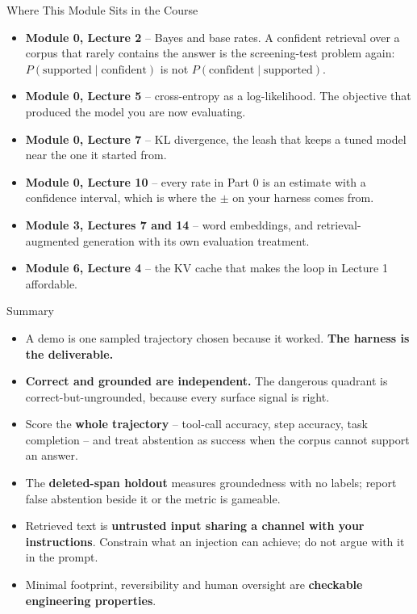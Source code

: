 \begin{frame}{Where This Module Sits in the Course}
\small
\begin{itemize}
  \item \textbf{Module 0, Lecture 2} -- Bayes and base rates. A confident retrieval over a corpus that rarely contains the answer is the screening-test problem again: $P(\text{supported} \mid \text{confident})$ is not $P(\text{confident} \mid \text{supported})$.
  \pause
  \item \textbf{Module 0, Lecture 5} -- cross-entropy as a log-likelihood. The objective that produced the model you are now evaluating.
  \pause
  \item \textbf{Module 0, Lecture 7} -- KL divergence, the leash that keeps a tuned model near the one it started from.
  \pause
  \item \textbf{Module 0, Lecture 10} -- every rate in Part 0 is an estimate with a confidence interval, which is where the $\pm$ on your harness comes from.
  \pause
  \item \textbf{Module 3, Lectures 7 and 14} -- word embeddings, and retrieval-augmented generation with its own evaluation treatment.
  \pause
  \item \textbf{Module 6, Lecture 4} -- the KV cache that makes the loop in Lecture 1 affordable.
\end{itemize}
\end{frame}

\begin{frame}{Summary}
\begin{itemize}
  \item A demo is one sampled trajectory chosen because it worked. \textbf{The harness is the deliverable.}
  \pause
  \item \textbf{Correct and grounded are independent.} The dangerous quadrant is correct-but-ungrounded, because every surface signal is right.
  \pause
  \item Score the \textbf{whole trajectory} -- tool-call accuracy, step accuracy, task completion -- and treat abstention as success when the corpus cannot support an answer.
  \pause
  \item The \textbf{deleted-span holdout} measures groundedness with no labels; report false abstention beside it or the metric is gameable.
  \pause
  \item Retrieved text is \textbf{untrusted input sharing a channel with your instructions}. Constrain what an injection can achieve; do not argue with it in the prompt.
  \pause
  \item Minimal footprint, reversibility and human oversight are \textbf{checkable engineering properties}.
\end{itemize}
\end{frame}

